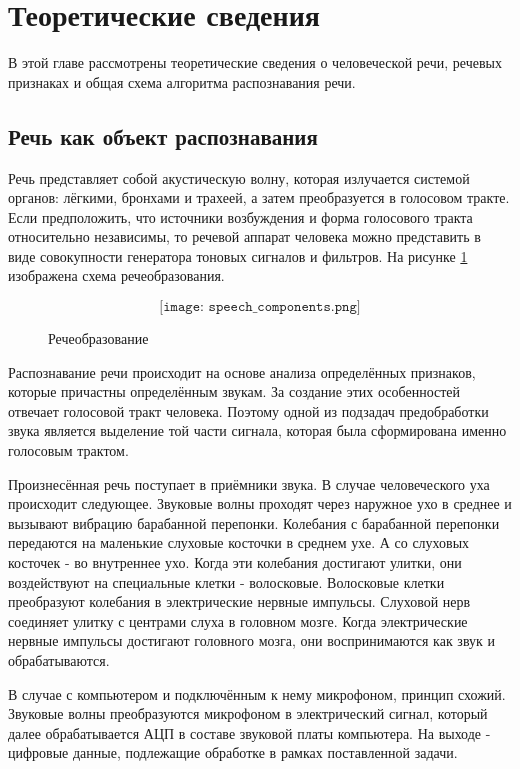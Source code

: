 \section{Теоретические сведения}
В этой главе рассмотрены теоретические сведения о человеческой речи, речевых признаках и общая схема алгоритма распознавания речи.

\subsection{Речь как объект распознавания}
Речь представляет собой акустическую волну, которая излучается системой органов: лёгкими, бронхами и трахеей, а затем преобразуется в голосовом тракте. Если предположить, что источники возбуждения и форма голосового тракта относительно независимы, то речевой аппарат человека можно представить в виде совокупности генератора тоновых сигналов и фильтров. На рисунке \ref{fig:speech_components} изображена схема речеобразования.

\begin{figure}[H]
	\[\texttt{[image: speech\_components.png]}\]
	\caption{Речеобразование}
	\label{fig:speech_components}
\end{figure}

Распознавание речи происходит на основе анализа определённых признаков, которые причастны определённым звукам. За создание этих особенностей отвечает голосовой тракт человека. Поэтому одной из подзадач предобработки звука является выделение той части сигнала, которая была сформирована именно голосовым трактом.

Произнесённая речь поступает в приёмники звука. В случае человеческого уха происходит следующее. Звуковые волны проходят через наружное ухо в среднее и вызывают вибрацию барабанной перепонки. Колебания с барабанной перепонки передаются на маленькие слуховые косточки в среднем ухе. А со слуховых косточек - во внутреннее ухо. Когда эти колебания достигают улитки, они воздействуют на специальные клетки - волосковые. Волосковые клетки преобразуют колебания в электрические нервные импульсы. Слуховой нерв соединяет улитку с центрами слуха в головном мозге. Когда электрические нервные импульсы достигают головного мозга, они воспринимаются как звук и обрабатываются.

В случае с компьютером и подключённым к нему микрофоном, принцип схожий. Звуковые волны преобразуются микрофоном в электрический сигнал, который далее обрабатывается АЦП в составе звуковой платы компьютера. На выходе - цифровые данные, подлежащие обработке в рамках поставленной задачи.


